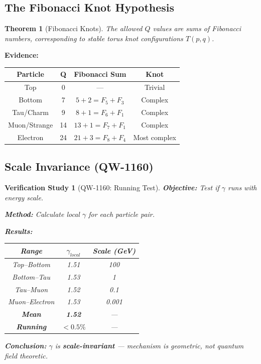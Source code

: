 \documentclass[11pt,a4paper]{book}
\newtheorem{theorem}{Theorem}[section]
\newtheorem{verification}{Verification Study}[section]
\theoremstyle{remark}
\begin{document}
\subsection{The Fibonacci Knot Hypothesis}

\begin{theorem}[Fibonacci Knots]
The allowed $Q$ values are sums of Fibonacci numbers, corresponding to stable torus knot configurations $T(p,q)$.
\end{theorem}

\textbf{Evidence:}
\begin{center}
\begin{tabular}{|c|c|c|c|}
\hline
\textbf{Particle} & \textbf{Q} & \textbf{Fibonacci Sum} & \textbf{Knot} \\
\hline
Top & 0 & --- & Trivial \\
Bottom & 7 & $5 + 2 = F_5 + F_3$ & Complex \\
Tau/Charm & 9 & $8 + 1 = F_6 + F_1$ & Complex \\
Muon/Strange & 14 & $13 + 1 = F_7 + F_1$ & Complex \\
Electron & 24 & $21 + 3 = F_8 + F_4$ & Most complex \\
\hline
\end{tabular}
\end{center}

\subsection{Scale Invariance (QW-1160)}

\begin{verification}[QW-1160: Running Test]
\textbf{Objective:} Test if $\gamma$ runs with energy scale.

\textbf{Method:} Calculate local $\gamma$ for each particle pair.

\textbf{Results:}
\begin{center}
\begin{tabular}{|c|c|c|}
\hline
\textbf{Range} & $\gamma_{local}$ & \textbf{Scale (GeV)} \\
\hline
Top--Bottom & 1.51 & 100 \\
Bottom--Tau & 1.53 & 1 \\
Tau--Muon & 1.52 & 0.1 \\
Muon--Electron & 1.53 & 0.001 \\
\hline
\textbf{Mean} & \textbf{1.52} & --- \\
\textbf{Running} & $<0.5\%$ & --- \\
\hline
\end{tabular}
\end{center}

\textbf{Conclusion:} $\gamma$ is \textbf{scale-invariant} --- mechanism is geometric, not quantum field theoretic.
\end{verification}
\end{document}
